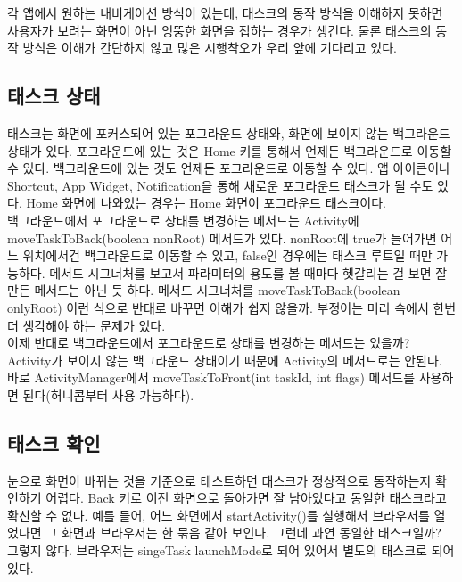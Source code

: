 각 앱에서 원하는 내비게이션 방식이 있는데, 태스크의 동작 방식을 이해하지 못하면 사용자가 보려는 화면이 아닌 엉뚱한 화면을 접하는 경우가 생긴다. 
물론 태스크의 동작 방식은 이해가 간단하지 않고 많은 시행착오가 우리 앞에 기다리고 있다.

\subsection{태스크 상태}
태스크는 화면에 포커스되어 있는 포그라운드 상태와, 화면에 보이지 않는 백그라운드 상태가 있다. 포그라운드에 있는 것은 Home 키를 통해서 언제든 백그라운드로 이동할 수 있다.
백그라운드에 있는 것도 언제든 포그라운드로 이동할 수 있다. 앱 아이콘이나 Shortcut, App Widget, Notification을 통해 새로운 포그라운드 태스크가 될 수도 있다. Home 화면에 나와있는 경우는 Home 화면이 포그라운드 태스크이다.\\

백그라운드에서 포그라운드로 상태를 변경하는 메서드는 Activity에 moveTaskToBack(boolean nonRoot) 메서드가 있다. 
nonRoot에 true가 들어가면 어느 위치에서건 백그라운드로 이동할 수 있고, false인 경우에는 태스크 루트일 때만 가능하다. 
메서드 시그너처를 보고서 파라미터의 용도를 볼 때마다 헷갈리는 걸 보면 잘 만든 메서드는 아닌 듯 하다. 
메서드 시그너처를 moveTaskToBack(boolean onlyRoot) 이런 식으로 반대로 바꾸면 이해가 쉽지 않을까. 부정어는 머리 속에서 한번 더 생각해야 하는 문제가 있다. \\

이제 반대로 백그라운드에서 포그라운드로 상태를 변경하는 메서드는 있을까? 
Activity가 보이지 않는 백그라운드 상태이기 때문에 Activity의 메서드로는 안된다.
바로 ActivityManager에서 moveTaskToFront(int taskId, int flags) 메서드를 사용하면 된다(허니콤부터 사용 가능하다).

\subsection{태스크 확인}
눈으로 화면이 바뀌는 것을 기준으로 테스트하면 태스크가 정상적으로 동작하는지 확인하기 어렵다. Back 키로 이전 화면으로 돌아가면 잘 남아있다고 동일한 태스크라고 확신할 수 없다.
예를 들어, 어느 화면에서 startActivity()를 실행해서 브라우저를 열었다면 그 화면과 브라우저는 한 묶음 같아 보인다. 그런데 과연 동일한 태스크일까? 그렇지 않다. 
브라우저는 singeTask launchMode로 되어 있어서 별도의 태스크로 되어 있다.\\

